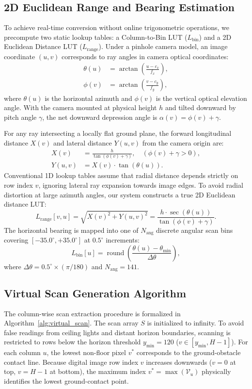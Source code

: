 \documentclass{ieeeaccess}
\begin{document}
\subsection{2D Euclidean Range and Bearing Estimation}
\label{subsec:lut}
To achieve real-time conversion without online trigonometric operations, we precompute two static lookup tables: a Column-to-Bin LUT ($L_{\mathrm{bin}}$) and a 2D Euclidean Distance LUT ($L_{\mathrm{range}}$).
Under a pinhole camera model, an image coordinate $(u, v)$ corresponds to ray angles in camera optical coordinates:
\begin{align}
  \theta(u) &= \arctan\left(\frac{u - c_x}{f_x}\right), \\
  \phi(v)   &= \arctan\left(\frac{v - c_y}{f_y}\right),
\end{align}
where $\theta(u)$ is the horizontal azimuth and $\phi(v)$ is the vertical optical elevation angle. With the camera mounted at physical height $h$ and tilted downward by pitch angle $\gamma$, the net downward depression angle is $\alpha(v) = \phi(v) + \gamma$.

For any ray intersecting a locally flat ground plane, the forward longitudinal distance $X(v)$ and lateral distance $Y(u, v)$ from the camera origin are:
\begin{align}
  X(v) &= \frac{h}{\tan(\phi(v) + \gamma)}, \quad (\phi(v) + \gamma > 0), \\
  Y(u, v) &= X(v) \cdot \tan(\theta(u)).
\end{align}
Conventional 1D lookup tables assume that radial distance depends strictly on row index $v$, ignoring lateral ray expansion towards image edges. To avoid radial distortion at large azimuth angles, our system constructs a true 2D Euclidean distance LUT:
\begin{equation}
  L_{\mathrm{range}}[v, u] = \sqrt{X(v)^2 + Y(u, v)^2} = \frac{h \cdot \sec(\theta(u))}{\tan(\phi(v) + \gamma)}.
\end{equation}
The horizontal bearing is mapped into one of $N_{\mathrm{ang}}$ discrete angular scan bins covering $[-35.0^\circ, +35.0^\circ]$ at $0.5^\circ$ increments:
\begin{equation}
  L_{\mathrm{bin}}[u] = \operatorname{round}\left(\frac{\theta(u) - \theta_{\min}}{\Delta \theta}\right),
\end{equation}
where $\Delta \theta = 0.5^\circ \times (\pi / 180)$ and $N_{\mathrm{ang}} = 141$.

\subsection{Virtual Scan Generation Algorithm}
The column-wise scan extraction procedure is formalized in Algorithm~\ref{alg:virtual_scan}. The scan array $S$ is initialized to infinity. To avoid false readings from ceiling lights and distant horizon boundaries, scanning is restricted to rows below the horizon threshold $y_{\min} = 120$ ($v \in [y_{\min}, H-1]$). For each column $u$, the lowest non-floor pixel $v^*$ corresponds to the ground-obstacle contact line. Because digital image row index $v$ increases downwards ($v=0$ at top, $v=H-1$ at bottom), the maximum index $v^* = \max(\mathcal{V}_u)$ physically identifies the lowest ground-contact point.
\end{document}
